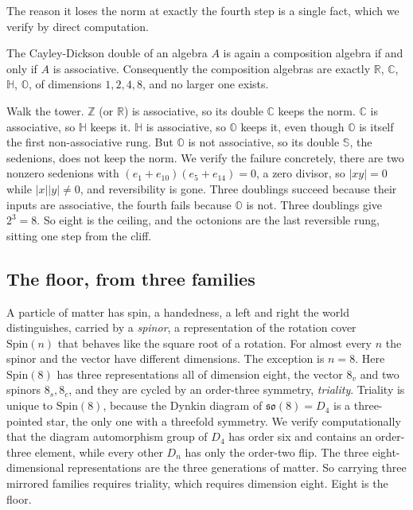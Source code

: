 The reason it loses the norm at exactly the fourth step is a single fact, which we verify by direct computation.

\begin{theorem}
The Cayley-Dickson double of an algebra $A$ is again a composition algebra if and only if $A$ is associative.
Consequently the composition algebras are exactly $\mathbb{R}$, $\mathbb{C}$, $\mathbb{H}$, $\mathbb{O}$, of dimensions
$1, 2, 4, 8$, and no larger one exists.
\end{theorem}

Walk the tower. $\mathbb{Z}$ (or $\mathbb{R}$) is associative, so its double $\mathbb{C}$ keeps the norm. $\mathbb{C}$
is associative, so $\mathbb{H}$ keeps it. $\mathbb{H}$ is associative, so $\mathbb{O}$ keeps it, even though
$\mathbb{O}$ is itself the first non-associative rung. But $\mathbb{O}$ is not associative, so its double $\mathbb{S}$,
the sedenions, does not keep the norm. We verify the failure concretely, there are two nonzero sedenions with
$(e_1 + e_{10})(e_5 + e_{14}) = 0$, a zero divisor, so $|xy| = 0$ while $|x||y| \neq 0$, and reversibility is gone.
Three doublings succeed because their inputs are associative, the fourth fails because $\mathbb{O}$ is not. Three
doublings give $2^3 = 8$. So eight is the ceiling, and the octonions are the last reversible rung, sitting one step
from the cliff.

\subsection{The floor, from three families}

A particle of matter has spin, a handedness, a left and right the world distinguishes, carried by a \emph{spinor}, a
representation of the rotation cover $\mathrm{Spin}(n)$ that behaves like the square root of a rotation. For almost
every $n$ the spinor and the vector have different dimensions. The exception is $n = 8$. Here $\mathrm{Spin}(8)$ has
three representations all of dimension eight, the vector $8_v$ and two spinors $8_s, 8_c$, and they are cycled by an
order-three symmetry, \emph{triality}. Triality is unique to $\mathrm{Spin}(8)$, because the Dynkin diagram of
$\mathfrak{so}(8) = D_4$ is a three-pointed star, the only one with a threefold symmetry. We verify computationally
that the diagram automorphism group of $D_4$ has order six and contains an order-three element, while every other
$D_n$ has only the order-two flip. The three eight-dimensional representations are the three generations of matter. So
carrying three mirrored families requires triality, which requires dimension eight. Eight is the floor.

